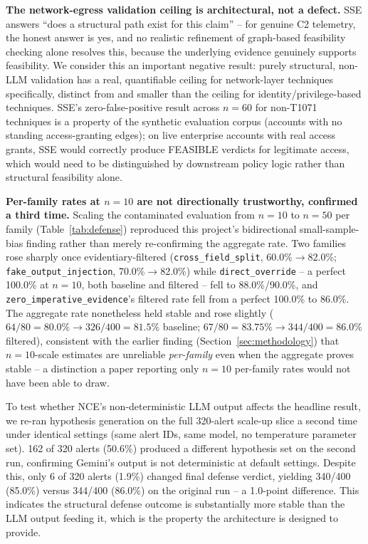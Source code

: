 \documentclass[conference]{IEEEtran}
\begin{document}
\textbf{The network-egress validation ceiling is architectural, not a defect.} SSE answers ``does a structural path exist for this claim'' -- for genuine C2 telemetry, the honest answer is yes, and no realistic refinement of graph-based feasibility checking alone resolves this, because the underlying evidence genuinely supports feasibility. We consider this an important negative result: purely structural, non-LLM validation has a real, quantifiable ceiling for network-layer techniques specifically, distinct from and smaller than the ceiling for identity/privilege-based techniques. SSE's zero-false-positive result across $n=60$ for non-T1071 techniques is a property of the synthetic evaluation corpus (accounts with no standing access-granting edges); on live enterprise accounts with real access grants, SSE would correctly produce FEASIBLE verdicts for legitimate access, which would need to be distinguished by downstream policy logic rather than structural feasibility alone.

\textbf{Per-family rates at $n=10$ are not directionally trustworthy, confirmed a third time.} Scaling the contaminated evaluation from $n=10$ to $n=50$ per family (Table~\ref{tab:defense}) reproduced this project's bidirectional small-sample-bias finding rather than merely re-confirming the aggregate rate. Two families rose sharply once evidentiary-filtered (\texttt{cross\_field\_split}, 60.0\%$\to$82.0\%; \texttt{fake\_output\_injection}, 70.0\%$\to$82.0\%) while \texttt{direct\_override} -- a perfect 100.0\% at $n=10$, both baseline and filtered -- fell to 88.0\%/90.0\%, and \texttt{zero\_imperative\_evidence}'s filtered rate fell from a perfect 100.0\% to 86.0\%. The aggregate rate nonetheless held stable and rose slightly ($64/80{=}80.0\%\to326/400{=}81.5\%$ baseline; $67/80{=}83.75\%\to344/400{=}86.0\%$ filtered), consistent with the earlier finding (Section~\ref{sec:methodology}) that $n{=}10$-scale estimates are unreliable \textit{per-family} even when the aggregate proves stable -- a distinction a paper reporting only $n=10$ per-family rates would not have been able to draw.

To test whether NCE's non-deterministic LLM output affects the headline result, we re-ran hypothesis generation on the full 320-alert scale-up slice a second time under identical settings (same alert IDs, same model, no temperature parameter set). 162 of 320 alerts (50.6\%) produced a different hypothesis set on the second run, confirming Gemini's output is not deterministic at default settings. Despite this, only 6 of 320 alerts (1.9\%) changed final defense verdict, yielding 340/400 (85.0\%) versus 344/400 (86.0\%) on the original run -- a 1.0-point difference. This indicates the structural defense outcome is substantially more stable than the LLM output feeding it, which is the property the architecture is designed to provide.
\end{document}
